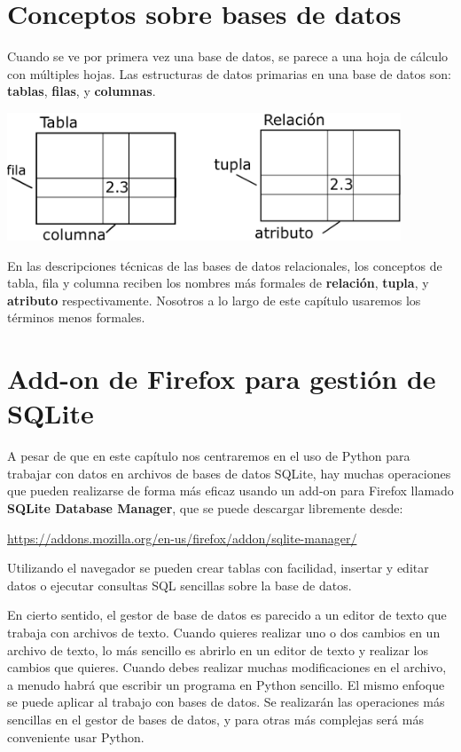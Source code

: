 \section{Conceptos sobre bases de datos}

Cuando se ve por primera vez una base de datos, se parece a una
hoja de cálculo con múltiples hojas. Las estructuras de datos primarias
en una base de datos son:
{\bf tablas}, {\bf filas}, y {\bf columnas}.  

\beforefig
\centerline{\includegraphics[height=1.50in]{figs2/relational.eps}}
\afterfig

En las descripciones técnicas de las bases de datos relacionales, los conceptos de
tabla, fila y columna reciben los nombres más formales
de {\bf relación}, {\bf tupla}, y {\bf atributo} respectivamente.
Nosotros a lo largo de este capítulo usaremos los términos menos formales.

\section{Add-on de Firefox para gestión de SQLite}

A pesar de que en este capítulo nos centraremos en el uso de Python para trabajar con datos
en archivos de bases de datos SQLite, hay muchas operaciones que pueden realizarse
de forma más eficaz usando un add-on para Firefox llamado {\bf SQLite
Database Manager}, que se puede descargar libremente desde:

\url{https://addons.mozilla.org/en-us/firefox/addon/sqlite-manager/}

Utilizando el navegador se pueden crear tablas con facilidad, insertar y editar datos
o ejecutar consultas SQL sencillas sobre la base de datos.

En cierto sentido, el gestor de base de datos es parecido a un editor de texto
que trabaja con archivos de texto. Cuando quieres realizar uno o
dos cambios en un archivo de texto, lo más sencillo es abrirlo en
un editor de texto y realizar los cambios que quieres. Cuando debes realizar
muchas modificaciones en el archivo, a menudo
habrá que escribir un programa en Python sencillo. El mismo enfoque
se puede aplicar al trabajo con bases de datos. Se realizarán las
operaciones más sencillas en el gestor de bases de datos, y para otras más complejas
será más conveniente usar Python.

